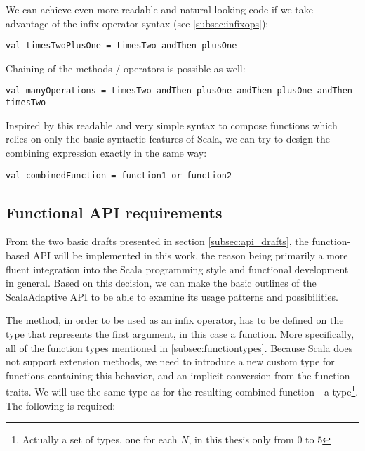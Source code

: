 We can achieve even more readable and natural looking code if we take advantage of the infix operator syntax (see \ref{subsec:infixops}):

\lstset{style=Scala}
\begin{lstlisting}
val timesTwoPlusOne = timesTwo andThen plusOne
\end{lstlisting}

Chaining of the methods / operators is possible as well:

\lstset{style=Scala}
\begin{lstlisting}
val manyOperations = timesTwo andThen plusOne andThen plusOne andThen timesTwo
\end{lstlisting}

Inspired by this readable and very simple syntax to compose functions which relies on only the basic syntactic features of Scala, we can try to design the combining expression exactly in the same way:

\lstset{style=Scala}
\begin{lstlisting}
val combinedFunction = function1 or function2
\end{lstlisting}

\subsection{Functional API requirements}

From the two basic drafts presented in section \ref{subsec:api_drafts}, the function-based API will be implemented in this work, the reason being primarily a more fluent integration into the Scala programming style and functional development in general. Based on this decision, we can make the basic outlines of the ScalaAdaptive API to be able to examine its usage patterns and possibilities.

The  method, in order to be used as an infix operator, has to be defined on the type that represents the first argument, in this case a function. More specifically, all of the function types mentioned in \ref{subsec:functiontypes}. Because Scala does not support extension methods, we need to introduce a new custom type for functions containing this behavior, and an implicit conversion from the function traits. We will use the same type as for the resulting combined function - a  type\footnote{Actually a set of types, one for each $N$, in this thesis only from $0$ to $5$}. The following is required:

